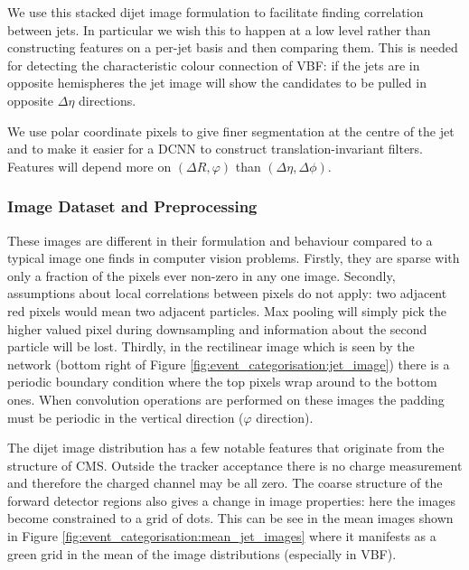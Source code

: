 
We use this stacked dijet image formulation to facilitate finding correlation between jets. 
In particular we wish this to happen at a low level rather than constructing features on a per-jet basis and then comparing them. 
This is needed for detecting the characteristic colour connection of VBF: if the jets are in opposite hemispheres the jet image will show the candidates to be pulled in opposite $\Delta\eta$ directions. 

We use polar coordinate pixels to give finer segmentation at the centre of the jet and to make it easier for a DCNN to construct translation-invariant filters. Features will depend more on $(\Delta{R},\varphi)$ than $(\Delta\eta,\Delta\phi)$. 


\subsubsection{Image Dataset and Preprocessing}
These images are different in their formulation and behaviour compared to a typical image one finds in computer vision problems.
Firstly, they are sparse with only a fraction of the pixels ever non-zero in any one image. 
Secondly, assumptions about local correlations between pixels do not apply: two adjacent red pixels would mean two adjacent particles. Max pooling will simply pick the higher valued pixel during downsampling and information about the second particle will be lost. 
Thirdly, in the rectilinear image which is seen by the network (bottom right of Figure \ref{fig:event_categorisation:jet_image}) there is a periodic boundary condition where the top pixels wrap around to the bottom ones. When convolution operations are performed on these images the padding must be periodic in the vertical direction ($\varphi$ direction).

The dijet image distribution has a few notable features that originate from the structure of CMS. Outside the tracker acceptance there is no charge measurement and therefore the charged \pt channel may be all zero. The coarse structure of the forward detector regions also gives a change in image properties: here the images become constrained to a grid of dots. This can be see in the mean images shown in Figure \ref{fig:event_categorisation:mean_jet_images} where it manifests as a green grid in the mean of the image distributions (especially in VBF).

